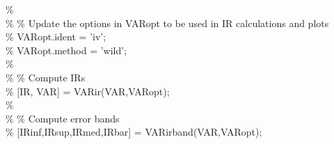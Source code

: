 \hspace{1mm}\hspace{5mm} \hspace{5mm} \textcolor{matlabgreen}{\%  }\\ 
\hspace{1mm}\hspace{5mm} \hspace{5mm} \textcolor{matlabgreen}{\% }\textcolor{matlabgreen}{\% Update the options in VARopt to be used in IR calculations and plots }\\ 
\hspace{1mm}\hspace{5mm} \hspace{5mm} \textcolor{matlabgreen}{\% VARopt.ident = 'iv'; }\\ 
\hspace{1mm}\hspace{5mm} \hspace{5mm} \textcolor{matlabgreen}{\% VARopt.method = 'wild'; }\\ 
\hspace{1mm}\hspace{5mm} \hspace{5mm} \textcolor{matlabgreen}{\%  }\\ 
\hspace{1mm}\hspace{5mm} \hspace{5mm} \textcolor{matlabgreen}{\% }\textcolor{matlabgreen}{\% Compute IRs }\\ 
\hspace{1mm}\hspace{5mm} \hspace{5mm} \textcolor{matlabgreen}{\% [IR, VAR] = VARir(VAR,VARopt); }\\ 
\hspace{1mm}\hspace{5mm} \hspace{5mm} \textcolor{matlabgreen}{\%  }\\ 
\hspace{1mm}\hspace{5mm} \hspace{5mm} \textcolor{matlabgreen}{\% }\textcolor{matlabgreen}{\% Compute error bands }\\ 
\hspace{1mm}\hspace{5mm} \hspace{5mm} \textcolor{matlabgreen}{\% [IRinf,IRsup,IRmed,IRbar] = VARirband(VAR,VARopt); }\\ 

